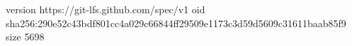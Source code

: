 version https://git-lfs.github.com/spec/v1
oid sha256:290e52c43bdf801cc4a029c66844ff29509e1173c3d59d5609c31611baab85f9
size 5698
